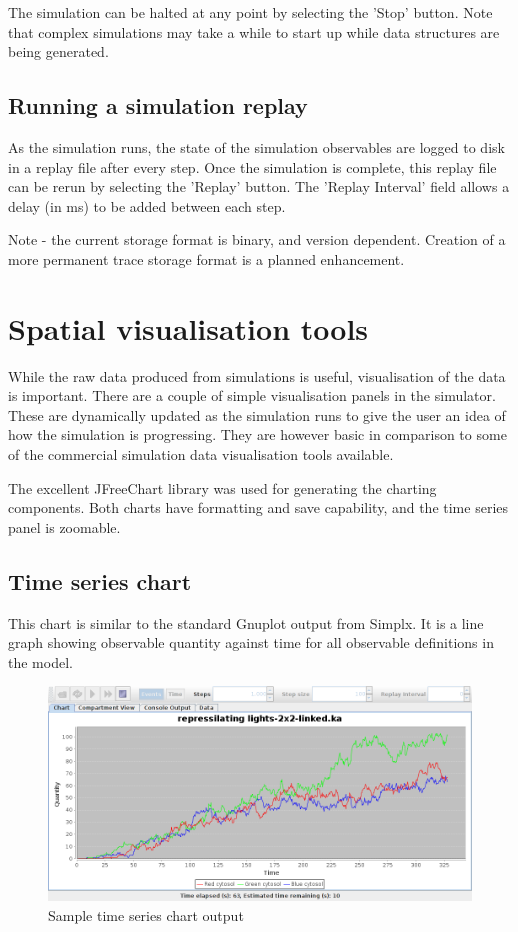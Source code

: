The simulation can be halted at any point by selecting the 'Stop' button. Note that complex simulations may take a while to start up while data structures are being generated.

\subsection{Running a simulation replay}

As the simulation runs, the state of the simulation observables are logged to disk in a replay file after every step. Once the simulation is complete, this replay file can be rerun by selecting the 'Replay' button. The 'Replay Interval' field allows a delay (in ms) to be added between each step.

Note - the current storage format is binary, and version dependent. Creation of a more permanent trace storage format is a planned enhancement.


\section{Spatial visualisation tools}

While the raw data produced from simulations is useful, visualisation of the data is important. There are a couple of simple visualisation panels in the simulator. These are dynamically updated as the simulation runs to give the user an idea of how the simulation is progressing. They are however basic in comparison to some of the commercial simulation data visualisation tools available.

The excellent JFreeChart \citep{JFreeChartwebsite} library was used for generating the charting components. Both charts have formatting and save capability, and the time series panel is zoomable.

\subsection{Time series chart}

This chart is similar to the standard Gnuplot output from Simplx. It is a line graph showing observable quantity against time for all observable definitions in the model.

\begin{figure}[h!]
 \centering
 \includegraphics[scale=0.3]{./images/ChartPane.png}
 \caption{Sample time series chart output}
 \label{fig:chartPane}
\end{figure}

